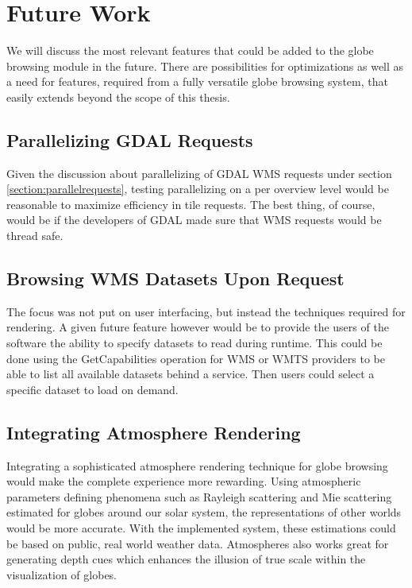 \chapter{Future Work}

We will discuss the most relevant features that could be added to the globe browsing module in the future. There are possibilities for optimizations as well as a need for features, required from a fully versatile globe browsing system, that easily extends beyond the scope of this thesis.

\section{Parallelizing GDAL Requests}
Given the discussion about parallelizing of GDAL WMS requests under section \ref{section:parallelrequests}, testing parallelizing on a per overview level would be reasonable to maximize efficiency in tile requests. The best thing, of course, would be if the developers of GDAL made sure that WMS requests would be thread safe.

\section{Browsing WMS Datasets Upon Request}
The focus was not put on user interfacing, but instead the techniques required for rendering. A given future feature however would be to provide the users of the software the ability to specify datasets to read during runtime. This could be done using the GetCapabilities operation for WMS or WMTS providers to be able to list all available datasets behind a service. Then users could select a specific dataset to load on demand.

\section{Integrating Atmosphere Rendering}
Integrating a sophisticated atmosphere rendering technique for globe browsing would make the complete experience more rewarding. Using atmospheric parameters defining phenomena such as Rayleigh scattering and Mie scattering estimated for globes around our solar system, the representations of other worlds would be more accurate. With the implemented system, these estimations could be based on public, real world weather data. Atmospheres also works great for generating depth cues which enhances the illusion of true scale within the visualization of globes.

